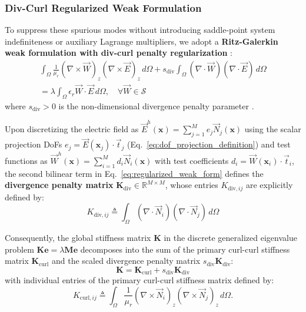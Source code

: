 \documentclass[preprint,12pt]{elsarticle}
\begin{document}
\subsubsection{Div-Curl Regularized Weak Formulation}
To suppress these spurious modes without introducing saddle-point system indefiniteness or auxiliary Lagrange multipliers, we adopt a \textbf{Ritz-Galerkin weak formulation with div-curl penalty regularization} \cite{monk2003finite, bossavit1998computational}:
\begin{multline}
\int_{\Omega} \frac{1}{\mu_r} (\nabla \times \vec{W})_z (\nabla \times \vec{E})_z \, d\Omega + s_{\mathrm{div}} \int_{\Omega} (\nabla \cdot \vec{W}) (\nabla \cdot \vec{E}) \, d\Omega \\
= \lambda \int_{\Omega} \epsilon_r \vec{W} \cdot \vec{E} \, d\Omega, \quad \forall \vec{W} \in \mathcal{S}
\label{eq:regularized_weak_form}
\end{multline}
where $s_{\mathrm{div}} > 0$ is the non-dimensional divergence penalty parameter \cite{monk2003finite}.

Upon discretizing the electric field as $\vec{E}^h(\mathbf{x}) = \sum_{j=1}^{M} e_j \vec{N}_j(\mathbf{x})$ using the scalar projection DoFs $e_j = \vec{E}(\mathbf{x}_j) \cdot \vec{t}_j$ (Eq.~\eqref{eq:dof_projection_definition}) and test functions as $\vec{W}^h(\mathbf{x}) = \sum_{i=1}^{M} d_i \vec{N}_i(\mathbf{x})$ with test coefficients $d_i = \vec{W}(\mathbf{x}_i) \cdot \vec{t}_i$, the second bilinear term in Eq.~\eqref{eq:regularized_weak_form} defines the \textbf{divergence penalty matrix} $\mathbf{K}_{\mathrm{div}} \in \mathbb{R}^{M \times M}$, whose entries $K_{\mathrm{div}, ij}$ are explicitly defined by:
\begin{equation}
K_{\mathrm{div}, ij} \triangleq \int_{\Omega} (\nabla \cdot \vec{N}_i) (\nabla \cdot \vec{N}_j) \, d\Omega
\label{eq:K_div_definition}
\end{equation}

Consequently, the global stiffness matrix $\mathbf{K}$ in the discrete generalized eigenvalue problem $\mathbf{K} \mathbf{e} = \lambda \mathbf{M} \mathbf{e}$ decomposes into the sum of the primary curl-curl stiffness matrix $\mathbf{K}_{\mathrm{curl}}$ and the scaled divergence penalty matrix $s_{\mathrm{div}} \mathbf{K}_{\mathrm{div}}$:
\begin{equation}
\mathbf{K} = \mathbf{K}_{\mathrm{curl}} + s_{\mathrm{div}} \mathbf{K}_{\mathrm{div}}
\label{eq:K_global_decomposition}
\end{equation}
with individual entries of the primary curl-curl stiffness matrix defined by:
\begin{equation}
K_{\mathrm{curl}, ij} \triangleq \int_{\Omega} \frac{1}{\mu_r} (\nabla \times \vec{N}_i)_z (\nabla \times \vec{N}_j)_z \, d\Omega.
\label{eq:K_curl_definition}
\end{equation}
\end{document}
